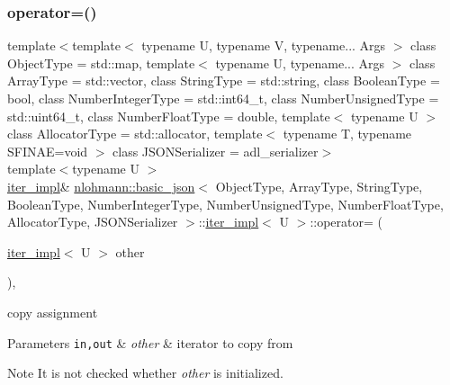 \subsubsection{\texorpdfstring{operator=()}{operator=()}}
{\footnotesize\ttfamily template$<$template$<$ typename U, typename V, typename... Args $>$ class Object\+Type = std\+::map, template$<$ typename U, typename... Args $>$ class Array\+Type = std\+::vector, class String\+Type  = std\+::string, class Boolean\+Type  = bool, class Number\+Integer\+Type  = std\+::int64\+\_\+t, class Number\+Unsigned\+Type  = std\+::uint64\+\_\+t, class Number\+Float\+Type  = double, template$<$ typename U $>$ class Allocator\+Type = std\+::allocator, template$<$ typename T, typename S\+F\+I\+N\+A\+E=void $>$ class J\+S\+O\+N\+Serializer = adl\+\_\+serializer$>$ \\
template$<$typename U $>$ \\
\hyperlink{classnlohmann_1_1basic__json_1_1iter__impl}{iter\+\_\+impl}\& \hyperlink{classnlohmann_1_1basic__json}{nlohmann\+::basic\+\_\+json}$<$ Object\+Type, Array\+Type, String\+Type, Boolean\+Type, Number\+Integer\+Type, Number\+Unsigned\+Type, Number\+Float\+Type, Allocator\+Type, J\+S\+O\+N\+Serializer $>$\+::\hyperlink{classnlohmann_1_1basic__json_1_1iter__impl}{iter\+\_\+impl}$<$ U $>$\+::operator= (\begin{DoxyParamCaption}\item[{\hyperlink{classnlohmann_1_1basic__json_1_1iter__impl}{iter\+\_\+impl}$<$ U $>$}]{other }\end{DoxyParamCaption})\hspace{0.3cm}{\ttfamily [inline]}, {\ttfamily [noexcept]}}



copy assignment 


\begin{DoxyParams}[1]{Parameters}
\mbox{\tt in,out}  & {\em other} & iterator to copy from \\
\hline
\end{DoxyParams}
\begin{DoxyNote}{Note}
It is not checked whether {\itshape other} is initialized. 
\end{DoxyNote}
\mbox{\label{classnlohmann_1_1basic__json_1_1iter__impl_af3beb0d08550188082ea64d8becd12fb}} 
